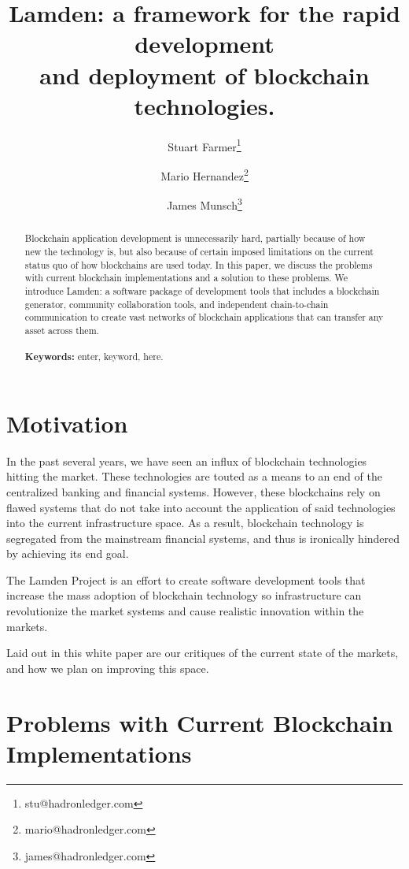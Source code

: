 \documentclass{%
	article}
\title{Lamden: a framework for the rapid development\\and deployment of blockchain technologies.}
\author{Stuart Farmer\thanks{stu@hadronledger.com}}
\author{Mario Hernandez\thanks{mario@hadronledger.com}}
\author{James Munsch\thanks{james@hadronledger.com}}
\affil{The Lamden Project, White Paper version 0.1.1}
\begin{document}
\sloppy

\begin{titlingpage}
    \maketitle
    \begin{abstract}
	Blockchain application development is unnecessarily hard, partially because of how new the technology is, but also because of certain imposed limitations on the current status quo of how blockchains are used today. In this paper, we discuss the problems with current blockchain implementations and a solution to these problems. We introduce Lamden: a software package of development tools that includes a blockchain generator, community collaboration tools, and independent chain-to-chain communication to create vast networks of blockchain applications that can transfer any asset across them.\\\\
	{\bf Keywords:} enter, keyword, here.
    \end{abstract}
\end{titlingpage}

\section{Motivation}

In the past several years, we have seen an influx of blockchain technologies hitting the market. These technologies are touted as a means to an end of the centralized banking and financial systems. However, these blockchains rely on flawed systems that do not take into account the application of said technologies into the current infrastructure space. As a result, blockchain technology is segregated from the mainstream financial systems, and thus is ironically hindered by achieving its end goal.

The Lamden Project is an effort to create software development tools that increase the mass adoption of blockchain technology so infrastructure can revolutionize the market systems and cause realistic innovation within the markets.

Laid out in this white paper are our critiques of the current state of the markets, and how we plan on improving this space.

\section{Problems with Current Blockchain\\ Implementations}
\end{document}
